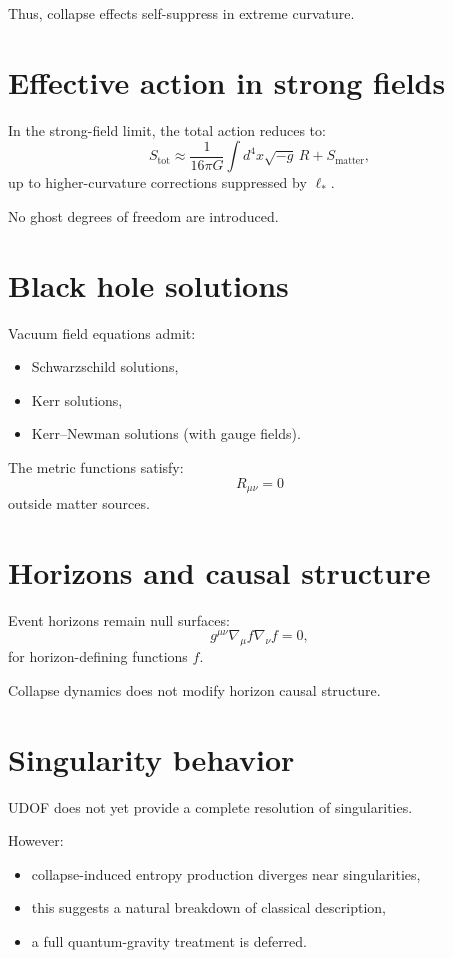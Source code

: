 \documentclass[11pt]{book}
\begin{document}
Thus, collapse effects self-suppress in extreme curvature.

\section{Effective action in strong fields}

In the strong-field limit, the total action reduces to:
\begin{equation}
S_{\mathrm{tot}}
\approx
\frac{1}{16\pi G}
\int d^4x \sqrt{-g}\,R
+
S_{\mathrm{matter}},
\end{equation}
up to higher-curvature corrections suppressed by $\ell_\ast$.

No ghost degrees of freedom are introduced.

\section{Black hole solutions}

Vacuum field equations admit:
\begin{itemize}
\item Schwarzschild solutions,
\item Kerr solutions,
\item Kerr--Newman solutions (with gauge fields).
\end{itemize}

The metric functions satisfy:
\begin{equation}
R_{\mu\nu} = 0
\end{equation}
outside matter sources.

\section{Horizons and causal structure}

Event horizons remain null surfaces:
\begin{equation}
g^{\mu\nu} \nabla_\mu f \nabla_\nu f = 0,
\end{equation}
for horizon-defining functions $f$.

Collapse dynamics does not modify horizon causal structure.

\section{Singularity behavior}

UDOF does not yet provide a complete resolution of singularities.

However:
\begin{itemize}
\item collapse-induced entropy production diverges near singularities,
\item this suggests a natural breakdown of classical description,
\item a full quantum-gravity treatment is deferred.
\end{itemize}
\end{document}
